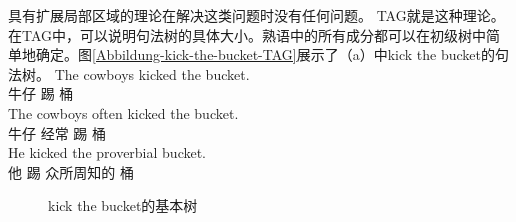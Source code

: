 \zl
具有扩展局部区域的理论在解决这类问题时没有任何问题。 TAG就是这种理论。在TAG中，可以说明句法树的具体大小\citep{Abeille88a,AS89a}。熟语中的所有成分都可以在初级树中简单地确定。图\vref{Abbildung-kick-the-bucket-TAG}展示了（a）中kick the bucket的句法树。
\eal
\ex 
\gll The cowboys kicked the bucket.\\
	  牛仔 踢  桶\\
\ex 
\gll The cowboys often kicked the bucket.\\
	  牛仔 经常 踢  桶\\
\ex 
\gll He kicked the proverbial bucket.\\
	 他 踢  众所周知的 桶\\
\zl
\begin{figure}
\centering
{}
\caption{\label{Abbildung-kick-the-bucket-TAG}kick the bucket的基本树}
\end{figure}%

